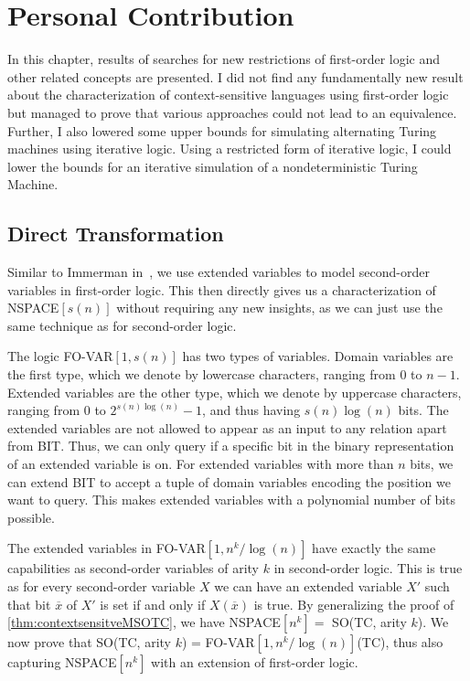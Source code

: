 \chapter{Personal Contribution}\label{ch:personal-contribution}

In this chapter, results of searches for new restrictions of first-order logic and other related concepts are presented.
I did not find any fundamentally new result about the characterization of context-sensitive languages using first-order logic but managed to prove that various approaches could not lead to an equivalence.
Further, I also lowered some upper bounds for simulating alternating Turing machines using iterative logic.
Using a restricted form of iterative logic, I could lower the bounds for an iterative simulation of a nondeterministic Turing Machine.


\section{Direct Transformation}\label{sec:direct-transformation}

Similar to Immerman in~\cite{descriptive-complexity}, we use extended variables to model second-order variables in first-order logic.
This then directly gives us a characterization of NSPACE$[s(n)]$ without requiring any new insights, as we can just use the same technique as for second-order logic.

\begin{define}
    The logic FO-VAR$[1, s(n)]$ has two types of variables.
    Domain variables are the first type, which we denote by lowercase characters, ranging from $0$ to $n - 1$.
    Extended variables are the other type, which we denote by uppercase characters, ranging from $0$ to $2^{s(n)\log(n)} - 1$, and thus having $s(n)\log(n)$ bits.
    The extended variables are not allowed to appear as an input to any relation apart from BIT\@.
    Thus, we can only query if a specific bit in the binary representation of an extended variable is on.
    For extended variables with more than $n$ bits, we can extend BIT to accept a tuple of domain variables encoding the position we want to query.
    This makes extended variables with a polynomial number of bits possible.
\end{define}

The extended variables in FO-VAR$[1, n^k / \log(n)]$ have exactly the same capabilities as second-order variables of arity $k$ in second-order logic.
This is true as for every second-order variable $X$ we can have an extended variable $X'$ such that bit $\overline{x}$ of $X'$ is set if and only if $X(\overline{x})$ is true.
By generalizing the proof of \cref{thm:contextsensitveMSOTC}, we have NSPACE$[n^k] = $ SO(TC, arity $k$).
We now prove that SO(TC, arity $k$) = FO-VAR$[1, n^k/\log(n)]$(TC), thus also capturing NSPACE$[n^k]$ with an extension of first-order logic.

